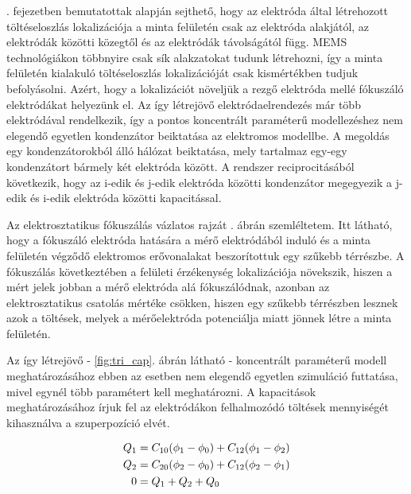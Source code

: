 . fejezetben bemutatottak alapján sejthető, hogy az elektróda által létrehozott töltéseloszlás lokalizációja a minta felületén csak az elektróda alakjától, az elektródák közötti közegtől és az elektródák távolságától függ. MEMS technológiákon többnyire csak sík alakzatokat tudunk létrehozni, így a minta felületén kialakuló töltéseloszlás lokalizációját csak kismértékben tudjuk befolyásolni. Azért, hogy a lokalizációt növeljük a rezgő elektróda mellé fókuszáló elektródákat helyezünk el. Az így létrejövő elektródaelrendezés már több elektródával rendelkezik, így a pontos koncentrált paraméterű modellezéshez nem elegendő egyetlen kondenzátor beiktatása az elektromos modellbe. A megoldás egy kondenzátorokból álló hálózat beiktatása, mely tartalmaz egy-egy kondenzátort bármely két elektróda között. A rendszer reciprocitásából következik, hogy az i-edik és j-edik elektróda közötti kondenzátor megegyezik a j-edik és i-edik elektróda közötti kapacitással.


Az elektrosztatikus fókuszálás vázlatos rajzát . ábrán szemléltetem. Itt látható, hogy a fókuszáló elektróda hatására a mérő elektródából induló és a minta felületén végződő elektromos erővonalakat beszorítottuk egy szűkebb térrészbe. A fókuszálás következtében a felületi érzékenység lokalizációja növekszik, hiszen a mért jelek jobban a mérő elektróda alá fókuszálódnak, azonban az elektrosztatikus csatolás mértéke csökken, hiszen egy szűkebb térrészben lesznek azok a töltések, melyek a mérőelektróda potenciálja miatt jönnek létre a minta felületén.


Az így létrejövő - \ref{fig:tri_cap}. ábrán látható - koncentrált paraméterű modell meghatározásához ebben az esetben nem elegendő egyetlen szimuláció futtatása, mivel egynél több paramétert kell meghatározni. A kapacitások meghatározásához írjuk fel az elektródákon felhalmozódó töltések mennyiségét kihasználva a szuperpozíció elvét.

\begin{align}
    \centering
    \begin{split}
        Q_1 &= C_{10}(\phi_1-\phi_0)+C_{12}(\phi_1-\phi_2) \\
        Q_2 &= C_{20}(\phi_2-\phi_0)+C_{12}(\phi_2-\phi_1) \\
        0 &= Q_1+Q_2+Q_0
    \end{split}
\end{align}

